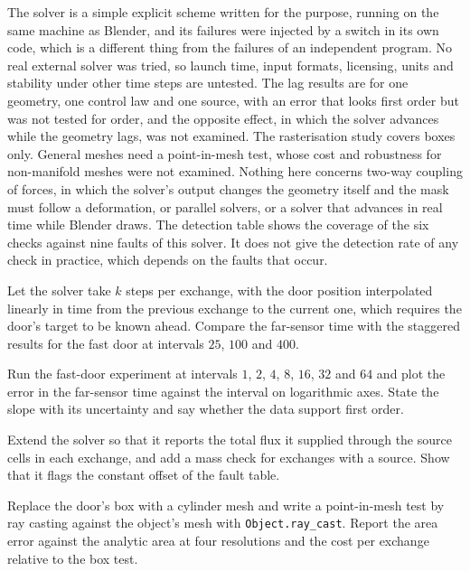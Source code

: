 The solver is a simple explicit scheme written for the purpose, running on the same machine as Blender, and its failures were injected by a switch in its own code, which is a different thing from the failures of an independent program. No real external solver was tried, so launch time, input formats, licensing, units and stability under other time steps are untested. The lag results are for one geometry, one control law and one source, with an error that looks first order but was not tested for order, and the opposite effect, in which the solver advances while the geometry lags, was not examined. The rasterisation study covers boxes only. General meshes need a point-in-mesh test, whose cost and robustness for non-manifold meshes were not examined. Nothing here concerns two-way coupling of forces, in which the solver's output changes the geometry itself and the mask must follow a deformation, or parallel solvers, or a solver that advances in real time while Blender draws. The detection table shows the coverage of the six checks against nine faults of this solver. It does not give the detection rate of any check in practice, which depends on the faults that occur.

\begin{exercise}[27.1: Subcycling]
Let the solver take $k$ steps per exchange, with the door position interpolated linearly in time from the previous exchange to the current one, which requires the door's target to be known ahead. Compare the far-sensor time with the staggered results for the fast door at intervals $25$, $100$ and $400$.
\end{exercise}

\begin{exercise}
Run the fast-door experiment at intervals $1$, $2$, $4$, $8$, $16$, $32$ and $64$ and plot the error in the far-sensor time against the interval on logarithmic axes. State the slope with its uncertainty and say whether the data support first order.
\end{exercise}

\begin{exercise}
Extend the solver so that it reports the total flux it supplied through the source cells in each exchange, and add a mass check for exchanges with a source. Show that it flags the constant offset of the fault table.
\end{exercise}

\begin{exercise}
Replace the door's box with a cylinder mesh and write a point-in-mesh test by ray casting against the object's mesh with \texttt{Object.ray\_cast}. Report the area error against the analytic area at four resolutions and the cost per exchange relative to the box test.
\end{exercise}
